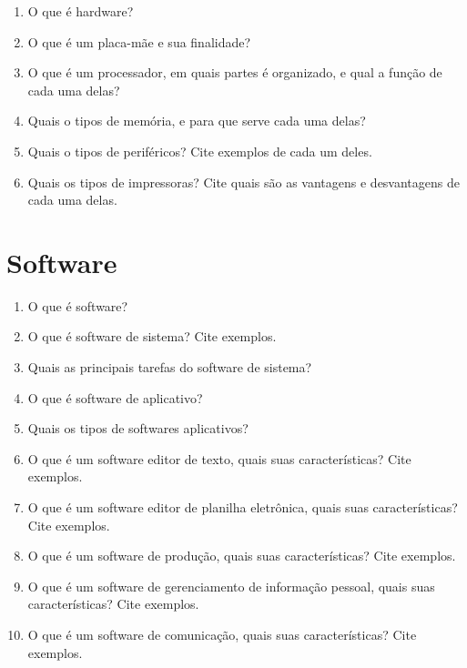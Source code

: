 \documentclass[11pt]{article}
\begin{document}
	\begin{enumerate}
		\item O que é hardware?
		\item O que é um placa-mãe e sua finalidade?
		\item O que é um processador, em quais partes é organizado, e qual a fun\c cão de cada uma delas?
		\item Quais o tipos de memória, e para que serve cada uma delas?
		\item Quais o tipos de periféricos? Cite exemplos de cada um deles.
		\item Quais os tipos de impressoras? Cite quais são as vantagens e desvantagens de cada uma delas.
	\end{enumerate}

	\newpage
	\section{Software}
	
	\begin{enumerate}
		\item O que é software?
		\item O que é software de sistema? Cite exemplos.
		\item Quais as principais tarefas do software de sistema?
		\item O que é software de aplicativo?
		\item Quais os tipos de softwares aplicativos?
		\item O que é um software editor de texto, quais suas características? Cite exemplos.
		\item O que é um software editor de planilha eletrônica, quais suas características? Cite exemplos.
		\item O que é um software de produção, quais suas características? Cite exemplos.
		\item O que é um software de gerenciamento de informação pessoal, quais suas características? Cite exemplos.
		\item O que é um software de comunicação, quais suas características? Cite exemplos.
	\end{enumerate}
	
\end{document}
